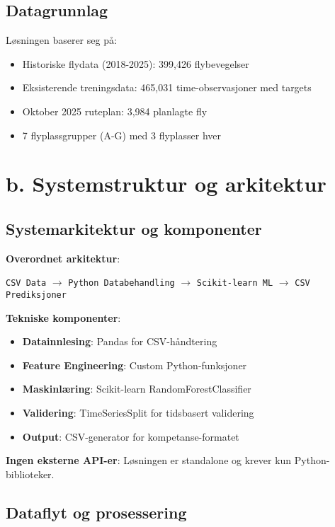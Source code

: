 \documentclass[11pt,a4paper]{article}
\begin{document}
\subsection{Datagrunnlag}
Løsningen baserer seg på:
\begin{itemize}
    \item Historiske flydata (2018-2025): 399,426 flybevegelser
    \item Eksisterende treningsdata: 465,031 time-observasjoner med targets
    \item Oktober 2025 ruteplan: 3,984 planlagte fly
    \item 7 flyplassgrupper (A-G) med 3 flyplasser hver
\end{itemize}

\section{b. Systemstruktur og arkitektur}

\subsection{Systemarkitektur og komponenter}

\textbf{Overordnet arkitektur}:
\begin{center}
\texttt{CSV Data} $\rightarrow$ \texttt{Python Databehandling} $\rightarrow$ \texttt{Scikit-learn ML} $\rightarrow$ \texttt{CSV Prediksjoner}
\end{center}

\textbf{Tekniske komponenter}:
\begin{itemize}
    \item \textbf{Datainnlesing}: Pandas for CSV-håndtering
    \item \textbf{Feature Engineering}: Custom Python-funksjoner
    \item \textbf{Maskinlæring}: Scikit-learn RandomForestClassifier
    \item \textbf{Validering}: TimeSeriesSplit for tidsbasert validering
    \item \textbf{Output}: CSV-generator for kompetanse-formatet
\end{itemize}

\textbf{Ingen eksterne API-er}: Løsningen er standalone og krever kun Python-biblioteker.

\subsection{Dataflyt og prosessering}
\end{document}
